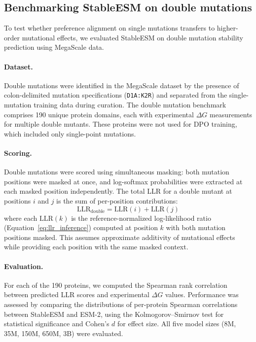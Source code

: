 \subsection{Benchmarking StableESM on double mutations}\label{sec:double_mutation_benchmark}

To test whether preference alignment on single mutations transfers to higher-order mutational effects, we evaluated StableESM on double mutation stability prediction using MegaScale data.

\paragraph{Dataset.}
Double mutations were identified in the MegaScale dataset by the presence of colon-delimited mutation specifications (\eg \texttt{D1A:K2R}) and separated from the single-mutation training data during curation.
The double mutation benchmark comprises 190 unique protein domains, each with experimental $\Delta G$ measurements for multiple double mutants.
These proteins were not used for DPO training, which included only single-point mutations.

\paragraph{Scoring.}
Double mutations were scored using simultaneous masking: both mutation positions were masked at once, and log-softmax probabilities were extracted at each masked position independently.
The total LLR for a double mutant at positions $i$ and $j$ is the sum of per-position contributions:
\begin{equation}
\text{LLR}_{\text{double}} = \text{LLR}(i) + \text{LLR}(j)
\end{equation}
where each $\text{LLR}(k)$ is the reference-normalized log-likelihood ratio (Equation~\ref{eq:llr_inference}) computed at position $k$ with both mutation positions masked.
This assumes approximate additivity of mutational effects while providing each position with the same masked context.

\paragraph{Evaluation.}
For each of the 190 proteins, we computed the Spearman rank correlation between predicted LLR scores and experimental $\Delta G$ values.
Performance was assessed by comparing the distributions of per-protein Spearman correlations between StableESM and ESM-2, using the Kolmogorov--Smirnov test for statistical significance and Cohen's $d$ for effect size.
All five model sizes (8M, 35M, 150M, 650M, 3B) were evaluated.

